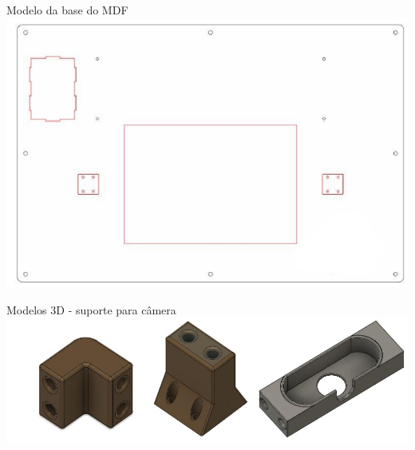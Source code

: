 \documentclass{beamer}
\begin{document}
\begin{frame}{Modelo da base do MDF}
  \centering
\includegraphics[width=0.95\paperwidth,keepaspectratio]{images/basemdf.png}
\end{frame}

\begin{frame}{Modelos 3D - suporte para câmera}
  \centering
\includegraphics[width=0.95\paperwidth,keepaspectratio]{images/camera.png}
\end{frame}
\end{document}
